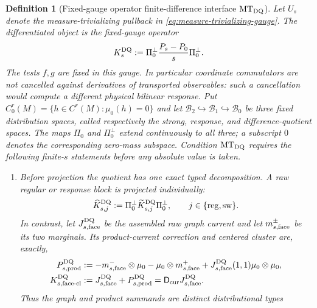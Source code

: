 \documentclass[11pt]{article}
\newtheorem{definition}[theorem]{Definition}
\newcommand{\cB}{\mathcal B}
\begin{document}
\begin{definition}[Fixed-gauge operator finite-difference interface
$\mathrm{MT}_{\rm DQ}$]
\label{def:measure-gauge-interface}
Let $U_s$ denote the measure-trivializing pullback in
\eqref{eq:measure-trivializing-gauge}.  The differentiated object is the
fixed-gauge operator
\begin{equation}
\label{eq:fixed-gauge-operator-DQ}
 K_s^{\rm DQ}:=\Pi_0^\perp\frac{P_s-P_0}{s}\Pi_0^\perp .
\end{equation}
The tests $f,g$ are fixed in this gauge.  In particular coordinate
commutators are not cancelled against derivatives of transported
observables: such a cancellation would compute a different physical
bilinear response.  Put
$C^r_0(M)=\{h\in C^r(M):\mu_0(h)=0\}$ and let
$\cB_2\hookrightarrow\cB_1\hookrightarrow\cB_0$ be three fixed distribution
spaces, called respectively the strong, response, and difference-quotient
spaces.  The maps $\Pi_0$ and $\Pi_0^\perp$ extend continuously to all three;
a subscript $0$ denotes the corresponding zero-mass subspace.  Condition
$\mathrm{MT}_{\rm DQ}$ requires the following finite-$s$ statements before
any absolute value is taken.
\begin{enumerate}[label=\textup{(MT\arabic*)}]
\item Before projection the quotient has one exact typed decomposition.  A
      raw regular or response block is projected individually:
      \begin{equation}
      \label{eq:typed-block-double-projection}
       \widehat K_{s,j}^{\rm DQ}
       :=\Pi_0^\perp\widetilde K_{s,j}^{\rm DQ}\Pi_0^\perp,
       \qquad j\in\{\mathrm{reg},\mathrm{sw}\}.
      \end{equation}
      In contrast, let $J_{s,\rm face}^{\rm DQ}$ be the assembled raw graph
      current and let $m_{s,\rm face}^{\pm}$ be its two marginals.  Its
      product-current correction and centered cluster are, exactly,
      \begin{align}
       P_{s,\rm prod}^{\rm DQ}
       &:=-m_{s,\rm face}^{-}\otimes\mu_0
          -\mu_0\otimes m_{s,\rm face}^{+}
          +J_{s,\rm face}^{\rm DQ}(1,1)\mu_0\otimes\mu_0,
          \label{eq:face-product-correction}\\
       K_{s,\rm face\text{-}cl}^{\rm DQ}
       &:=J_{s,\rm face}^{\rm DQ}+P_{s,\rm prod}^{\rm DQ}
        =\mathsf D_{\rm cur}J_{s,\rm face}^{\rm DQ}.
          \label{eq:typed-face-product-cluster}
      \end{align}
      Thus the graph and product summands are distinct distributional types

\end{enumerate}
\end{definition}
\end{document}

